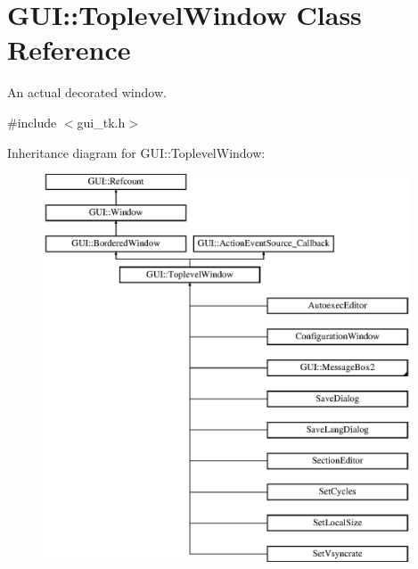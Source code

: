 \hypertarget{classGUI_1_1ToplevelWindow}{\section{G\-U\-I\-:\-:Toplevel\-Window Class Reference}
\label{classGUI_1_1ToplevelWindow}
}


An actual decorated window.  




{\ttfamily \#include $<$gui\-\_\-tk.\-h$>$}

Inheritance diagram for G\-U\-I\-:\-:Toplevel\-Window\-:\begin{figure}[H]
\begin{center}
\leavevmode
\includegraphics[height=11.500790cm]{classGUI_1_1ToplevelWindow}
\end{center}
\end{figure}

